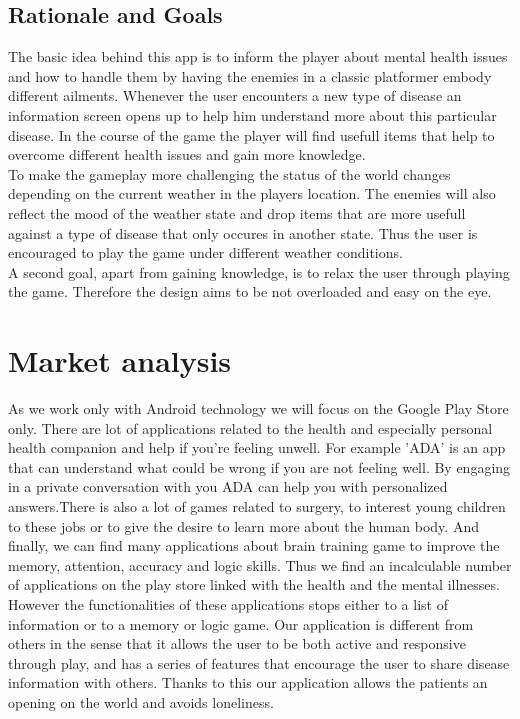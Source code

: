 \documentclass{sigchi}
\begin{document}
\subsection{Rationale and Goals}
The basic idea behind this app is to inform the player about mental health issues and how to handle them by having the enemies in a classic platformer embody different ailments. Whenever the user encounters a new type of disease an information screen opens up to help him understand more about this particular disease. In the course of the game the player will find usefull items that help to overcome different health issues and gain more knowledge.\\
To make the gameplay more challenging the status of the world changes depending on the current weather in the players location. The enemies will also reflect the mood of the weather state and drop items that are more usefull against a type of disease that only occures in another state. Thus the user is encouraged to play the game under different weather conditions.\\
A second goal, apart from gaining knowledge, is to relax the user through playing the game. Therefore the design aims to be not overloaded and easy on the eye.

\section{Market analysis}
As we work only with Android technology we will focus on the Google Play Store only.
There are lot of applications related to the health and especially personal health companion and help if you're feeling unwell. For example 'ADA' is an app that can understand what could be wrong if you are not feeling well. By engaging in a private conversation with you ADA can help you with personalized answers.There is also a lot of games related to surgery, to interest young children to these jobs or to give the desire to learn more about the human body. And finally, we can find many applications about brain training game to improve the memory, attention, accuracy and logic skills. Thus we find an incalculable number of applications on the play store linked with the health and the mental illnesses. However the functionalities of these applications stops either to a list of information or to a memory or logic game. Our application is different from others in the sense that it allows the user to be both active and responsive through play, and has a series of features that encourage the user to share disease information with others. Thanks to this our application allows the patients an opening on the world and avoids loneliness.
\end{document}
